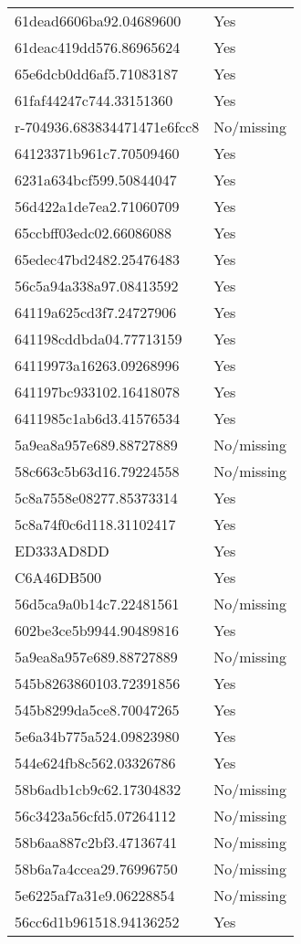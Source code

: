 \begin{tabular}{ll}
61dead6606ba92.04689600 & Yes \\
61deac419dd576.86965624 & Yes \\
65e6dcb0dd6af5.71083187 & Yes \\
61faf44247c744.33151360 & Yes \\
r-704936.683834471471e6fcc8 & No/missing \\
64123371b961c7.70509460 & Yes \\
6231a634bcf599.50844047 & Yes \\
56d422a1de7ea2.71060709 & Yes \\
65ccbff03edc02.66086088 & Yes \\
65edec47bd2482.25476483 & Yes \\
56c5a94a338a97.08413592 & Yes \\
64119a625cd3f7.24727906 & Yes \\
641198cddbda04.77713159 & Yes \\
64119973a16263.09268996 & Yes \\
641197bc933102.16418078 & Yes \\
6411985c1ab6d3.41576534 & Yes \\
5a9ea8a957e689.88727889 & No/missing \\
58c663c5b63d16.79224558 & No/missing \\
5c8a7558e08277.85373314 & Yes \\
5c8a74f0c6d118.31102417 & Yes \\
ED333AD8DD & Yes \\
C6A46DB500 & Yes \\
56d5ca9a0b14c7.22481561 & No/missing \\
602be3ce5b9944.90489816 & Yes \\
5a9ea8a957e689.88727889 & No/missing \\
545b8263860103.72391856 & Yes \\
545b8299da5ce8.70047265 & Yes \\
5e6a34b775a524.09823980 & Yes \\
544e624fb8c562.03326786 & Yes \\
58b6adb1cb9c62.17304832 & No/missing \\
56c3423a56cfd5.07264112 & No/missing \\
58b6aa887c2bf3.47136741 & No/missing \\
58b6a7a4ccea29.76996750 & No/missing \\
5e6225af7a31e9.06228854 & No/missing \\
56cc6d1b961518.94136252 & Yes \\

\end{tabular}
